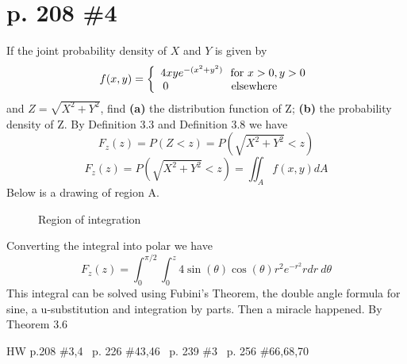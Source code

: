 \documentclass[12pt]{article}
\begin{document}
	\section[20pt]{p. 208 \#4}
	If the joint probability density of \(X\) and \(Y\) is given by
	\[f(x,y)=\left\{\begin{array}{ccc}
	4xye^{-(x^2+y^2)}\ \ \textup{for}\ x>0,y>0\\0 \ \ \ \ \ \ \ \ \ \ \ \ \ \ \ \ \ \textup{elsewhere} \ \ \ \ \ \ \ 
	\end{array} \right.\]
	and \(Z=\sqrt{X^2+Y^2}\), find \newline
	\textbf{(a)} the distribution function of Z; \newline
	\textbf{(b)} the probability density of Z. \newline
	\newline
	By Definition 3.3 and Definition 3.8 we have
	\[F_z(z)=P(Z<z)=P(\sqrt{X^2+Y^2}<z)\]
	\[F_z(z)=P(\sqrt{X^2+Y^2}<z)=\iint_Af(x,y)dA\]
	Below is a drawing of region A.
	\begin{figure}[ht]
		\centering
		\caption{Region of integration}
	\end{figure}
	Converting the integral into polar we have
	\[F_z(z)=\int_0^{\pi/2}\int_0^{z}4\sin(\theta)\cos(\theta)r^2e^{-r^2}rdr\ d\theta\]
	This integral can be solved using Fubini's Theorem, the double angle formula for sine, a u-substitution and integration by parts. \newline
	Then a miracle happened. \newline \newline
	 \newline \newline
	By Theorem 3.6 \newline
	\newpage
	\maketitle HW p.208 \#3,4 \ p. 226 \#43,46 \ p. 239 \#3 \ p. 256 \#66,68,70
\end{document}
